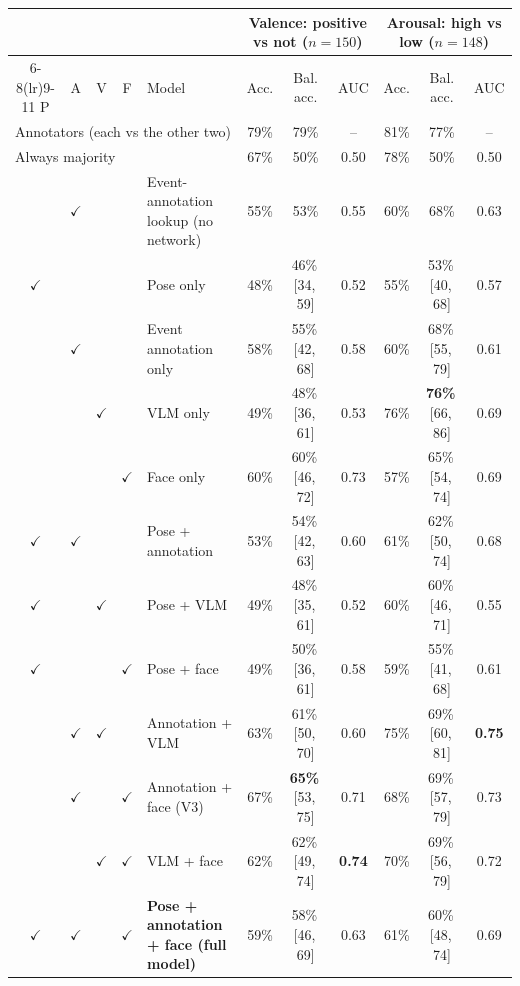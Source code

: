 \documentclass[11pt]{article}
\newcommand{\best}[1]{\textbf{#1}}
\newcommand{\ci}[2]{\,[#1,\,#2]}
\begin{document}
\begin{table}[!htbp]
\label{tab:streams}
\small
\setlength{\tabcolsep}{3.5pt}
\begin{tabular}{cccclcccccc}
\toprule
 & & & & & \multicolumn{3}{c}{Valence: positive vs not ($n{=}150$)} & \multicolumn{3}{c}{Arousal: high vs low ($n{=}148$)} \\
\cmidrule(lr){6-8}\cmidrule(lr){9-11}
P & A & V & F & Model & Acc. & Bal. acc. & AUC & Acc. & Bal. acc. & AUC \\
\midrule
\multicolumn{5}{l}{Annotators (each vs the other two)} & 79\% & 79\% & -- & 81\% & 77\% & -- \\
\multicolumn{5}{l}{Always majority} & 67\% & 50\% & 0.50 & 78\% & 50\% & 0.50 \\
 & $\checkmark$ & & & Event-annotation lookup (no network) & 55\% & 53\% & 0.55 & 60\% & 68\% & 0.63 \\
\midrule
$\checkmark$ & & & & Pose only & 48\% & 46\%\ci{34}{59} & 0.52 & 55\% & 53\%\ci{40}{68} & 0.57 \\
 & $\checkmark$ & & & Event annotation only & 58\% & 55\%\ci{42}{68} & 0.58 & 60\% & 68\%\ci{55}{79} & 0.61 \\
 & & $\checkmark$ & & VLM only & 49\% & 48\%\ci{36}{61} & 0.53 & 76\% & \best{76\%}\ci{66}{86} & 0.69 \\
 & & & $\checkmark$ & Face only & 60\% & 60\%\ci{46}{72} & 0.73 & 57\% & 65\%\ci{54}{74} & 0.69 \\
\midrule
$\checkmark$ & $\checkmark$ & & & Pose + annotation & 53\% & 54\%\ci{42}{63} & 0.60 & 61\% & 62\%\ci{50}{74} & 0.68 \\
$\checkmark$ & & $\checkmark$ & & Pose + VLM & 49\% & 48\%\ci{35}{61} & 0.52 & 60\% & 60\%\ci{46}{71} & 0.55 \\
$\checkmark$ & & & $\checkmark$ & Pose + face & 49\% & 50\%\ci{36}{61} & 0.58 & 59\% & 55\%\ci{41}{68} & 0.61 \\
 & $\checkmark$ & $\checkmark$ & & Annotation + VLM & 63\% & 61\%\ci{50}{70} & 0.60 & 75\% & 69\%\ci{60}{81} & \best{0.75} \\
 & $\checkmark$ & & $\checkmark$ & Annotation + face (V3) & 67\% & \best{65\%}\ci{53}{75} & 0.71 & 68\% & 69\%\ci{57}{79} & 0.73 \\
 & & $\checkmark$ & $\checkmark$ & VLM + face & 62\% & 62\%\ci{49}{74} & \best{0.74} & 70\% & 69\%\ci{56}{79} & 0.72 \\
\midrule
$\checkmark$ & $\checkmark$ & & $\checkmark$ & \textbf{Pose + annotation + face (full model)} & 59\% & 58\%\ci{46}{69} & 0.63 & 61\% & 60\%\ci{48}{74} & 0.69 \\

\end{tabular}
\end{table}
\end{document}
